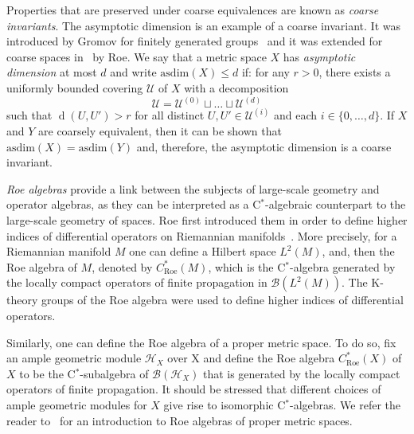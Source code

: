 \documentclass[a4paper]{amsart}
\newcommand{\myhyp}{\textnormal{-}\hskip0pt\relax}
\numberwithin{equation}{section}
\newcommand{\Bcal}{\mathcal{B}}
\newcommand{\Hcal}{\mathcal{H}}
\newcommand{\Ucal}{\mathcal{U}}
\newcommand{\cstar}{C$^\ast$\myhyp{}algebra}
\newcommand{\cstarSub}{C$^\ast$\myhyp{}subalgebra}
\newcommand{\bop}[1]{\Bcal({#1})}
\newcommand{\Croe}[1]{C^{\ast}_{\mathrm{Roe}}(#1)}
\newcommand{\prn}[1]{{(#1)}}
\DeclareMathOperator{\dist}{d}
\newcommand{\asdim}[1]{\mathrm{asdim}({#1})}
\theoremstyle{plain}
\theoremstyle{indented}
\numberwithin{equation}{section}
\theoremstyle{definition}
\theoremstyle{remark}
\theoremstyle{plain}
\theoremstyle{definition}
\begin{document}
Properties that are preserved under coarse equivalences are known as \emph{coarse invariants}. 
The {asymptotic dimension} is an example of a coarse invariant.
It 
was introduced by Gromov for finitely generated groups~\cite{Gromov1993AsymptoticInvariantsInfiniteGroups} and it was extended for coarse spaces in~\cite{Roe2003lecturesCrsGeometry} by Roe.  
We say that a metric space $X$ has \emph{asymptotic dimension} at most $d$ and write ${\asdim{X}\le d}$ if:
for any ${r>0}$, there exists a uniformly bounded covering $\Ucal$ of $X$
with a decomposition 
\[\Ucal = \Ucal^{\prn{0}} \sqcup \hdots \sqcup \Ucal^{\prn{d}}\]
such that ${\dist(U , U') > r}$ for all distinct ${U , U' \in \Ucal^{\prn{i}}}$ and 
each ${i \in \{0,\hdots,d\}}$. 
If $X$ and $Y$ are coarsely equivalent, then it can be shown that ${\asdim{X}=\asdim{Y}}$  
and, therefore, the asymptotic dimension is a coarse invariant. 

\emph{Roe algebras} provide a link between the subjects of large\myhyp{}scale geometry and operator algebras, as they can be interpreted as a \cstar{}ic counterpart to the large\myhyp{}scale geometry of spaces.
Roe first introduced them in order to define higher indices of differential operators on Riemannian manifolds~\cite{Roe1988IndexThm1, Roe1988IndexThm2, Roe1993CoarseCohomologyIndexTheory, Roe1996IndexTheoryCoarseGeometryTopology}.
More precisely,
for a Riemannian manifold $M$ one can define a Hilbert space $L^2(M)$, and,
then
the Roe algebra of $M$, denoted by $\Croe{M}$, 
which is the \cstar{} generated by the locally compact operators of finite propagation in $\bop{L^2(M)}$. 
The K\myhyp{}theory groups of the Roe algebra were used to define higher indices of differential operators. 

Similarly, one can define the Roe algebra of a proper metric space.
To do so, fix an ample geometric module $\Hcal_X$ over X and define the Roe algebra $\Croe{X}$ of $X$ 
to be the \cstarSub{} of $\bop{\Hcal_X}$ that is
generated by
the locally compact operators of finite propagation. 
It should be stressed that different choices of ample geometric modules for $X$ give rise to isomorphic \cstar{}s.
We refer the reader to~\cite{WillettYu2020HigherIndexTheory} for an introduction to Roe algebras of proper metric spaces.
\end{document}
